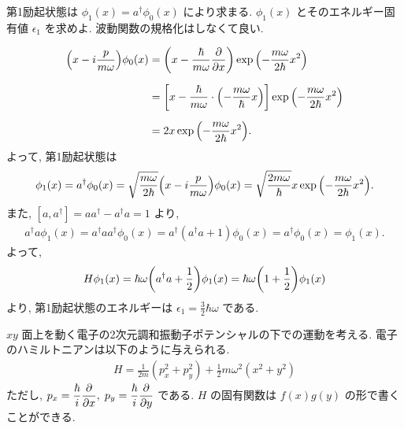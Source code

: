 \documentclass[../../ou-physics-exam.tex]{subfiles}
\begin{document}
第1励起状態は $ \phi_1 (x) = a^{\dagger} \phi_0 (x) $ により求まる. 
$ \phi_1 (x) $ とそのエネルギー固有値 $ \epsilon_1 $ を求めよ. 
波動関数の規格化はしなくて良い.
\begin{answer}
    \begin{align*}
        \qty(x - i \frac{p}{m \omega}) \phi_0 (x) 
        & = \qty(x - \frac{\hbar}{m \omega} \pdv{x}) \exp \qty(- \frac{m \omega}{2 \hbar} x^2) \\[2mm]
        & = \qty[x - \frac{\hbar}{m \omega} \cdot \qty(- \frac{m \omega}{\hbar}x)] \exp \qty(- \frac{m \omega}{2 \hbar} x^2) \\[2mm]
        & = 2x \exp \qty(- \frac{m \omega}{2 \hbar} x^2).
    \end{align*}
    よって, 第1励起状態は
    \begin{align*}
        \phi_1 (x) = a^{\dagger} \phi_0 (x) = \sqrt{\frac{m \omega}{2 \hbar}} \qty(x - i \frac{p}{m \omega}) \phi_0 (x) = \sqrt{\frac{2m \omega}{\hbar}} x \exp \qty(- \frac{m \omega}{2 \hbar} x^2).
    \end{align*}
    また, $ [a, a^{\dagger}] = a a^{\dagger} - a^{\dagger} a = 1 $ より,
    \begin{align*}
        a^{\dagger} a \phi_1 (x) = a^{\dagger} a a^{\dagger} \phi_0(x) = a^{\dagger} (a^{\dagger} a + 1) \phi_0 (x) = a^{\dagger} \phi_0 (x) = \phi_1 (x).
    \end{align*}
    よって,
    \begin{align*}
        H \phi_1 (x) = \hbar \omega \qty(a^{\dagger} a + \frac{1}{2}) \phi_1 (x) = \hbar \omega \qty(1 + \frac{1}{2}) \phi_1 (x)
    \end{align*}
    より, 第1励起状態のエネルギーは $ \displaystyle \epsilon_1 = \frac{3}{2} \hbar \omega $ である.
\end{answer}

$ xy $ 面上を動く電子の2次元調和振動子ポテンシャルの下での運動を考える. 
電子のハミルトニアンは以下のように与えられる.
\begin{align*}
    H = \frac{1}{2m} (p_x^2 + p_y^2) + \frac{1}{2} m \omega^2 (x^2 + y^2)
\end{align*}
ただし, $ \displaystyle p_x = \frac{\hbar}{i} \pdv{x}, \; p_y = \frac{\hbar}{i} \pdv{y} $ である. 
$ H $ の固有関数は $ f(x)g(y) $ の形で書くことができる.
\end{document}
